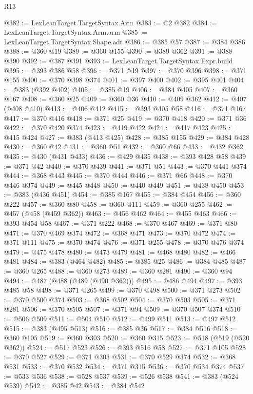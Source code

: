 \begin{lexlean}{R13}
\begin{coremodule}
@382 := LexLeanTarget.TargetSyntax.Arm
@383 := @2 @382
@384 := LexLeanTarget.TargetSyntax.Arm.arm
@385 := LexLeanTarget.TargetSyntax.Shape.adt
@386 := @385 @57
@387 := @384 @386
@388 := @360 @19
@389 := @360 @155
@390 := @389 @362
@391 := @388 @390
@392 := @387 @391
@393 := LexLeanTarget.TargetSyntax.Expr.build
@395 := @393 @386 @58
@396 := @371 @19
@397 := @370 @396
@398 := @371 @155
@400 := @370 @398 @374
@401 := @397 @400
@402 := @395 @401
@404 := @383 (@392 @402)
@405 := @385 @19
@406 := @384 @405
@407 := @360 @167
@408 := @360 @25
@409 := @360 @36
@410 := @409 @362
@412 := @407 (@408 @410)
@413 := @406 @412
@415 := @393 @405 @58
@416 := @371 @167
@417 := @370 @416
@418 := @371 @25
@419 := @370 @418
@420 := @371 @36
@422 := @370 @420 @374
@423 := @419 @422
@424 := @417 @423
@425 := @415 @424
@427 := @383 (@413 @425)
@428 := @385 @155
@429 := @384 @428
@430 := @360 @42
@431 := @360 @51
@432 := @360 @66
@433 := @432 @362
@435 := @430 (@431 @433)
@436 := @429 @435
@438 := @393 @428 @58
@439 := @371 @42
@440 := @370 @439
@441 := @371 @51
@443 := @370 @441 @374
@444 := @368 @443
@445 := @370 @444
@446 := @371 @66
@448 := @370 @446 @374
@449 := @445 @448
@450 := @440 @449
@451 := @438 @450
@453 := @383 (@436 @451)
@454 := @385 @167
@455 := @384 @454
@456 := @360 @222
@457 := @360 @80
@458 := @360 @111
@459 := @360 @255
@462 := @457 (@458 (@459 @362))
@463 := @456 @462
@464 := @455 @463
@466 := @393 @454 @58
@467 := @371 @222
@468 := @370 @467
@469 := @371 @80
@471 := @370 @469 @374
@472 := @368 @471
@473 := @370 @472
@474 := @371 @111
@475 := @370 @474
@476 := @371 @255
@478 := @370 @476 @374
@479 := @475 @478
@480 := @473 @479
@481 := @468 @480
@482 := @466 @481
@484 := @383 (@464 @482)
@485 := @385 @25
@486 := @384 @485
@487 := @360 @265
@488 := @360 @273
@489 := @360 @281
@490 := @360 @94
@494 := @487 (@488 (@489 (@490 @362)))
@495 := @486 @494
@497 := @393 @485 @58
@498 := @371 @265
@499 := @370 @498
@500 := @371 @273
@502 := @370 @500 @374
@503 := @368 @502
@504 := @370 @503
@505 := @371 @281
@506 := @370 @505
@507 := @371 @94
@509 := @370 @507 @374
@510 := @506 @509
@511 := @504 @510
@512 := @499 @511
@513 := @497 @512
@515 := @383 (@495 @513)
@516 := @385 @36
@517 := @384 @516
@518 := @360 @105
@519 := @360 @303
@520 := @360 @315
@523 := @518 (@519 (@520 @362))
@524 := @517 @523
@526 := @393 @516 @58
@527 := @371 @105
@528 := @370 @527
@529 := @371 @303
@531 := @370 @529 @374
@532 := @368 @531
@533 := @370 @532
@534 := @371 @315
@536 := @370 @534 @374
@537 := @533 @536
@538 := @528 @537
@539 := @526 @538
@541 := @383 (@524 @539)
@542 := @385 @42
@543 := @384 @542

\end{coremodule}
\end{lexlean}

